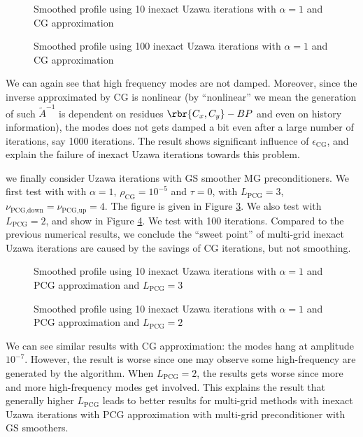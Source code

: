 \documentclass[english, nochinese]{pnote}
\begin{document}
\begin{figure}[htbp]
\centering
\scalebox{0.75}{}
\caption{Smoothed profile using 10 inexact Uzawa iterations with $ \alpha = 1 $ and CG approximation}
\label{Fig:SmoothIUzwCG10}
\end{figure}

\begin{figure}[htbp]
\centering
\scalebox{0.75}{}
\caption{Smoothed profile using 100 inexact Uzawa iterations with $ \alpha = 1 $ and CG approximation}
\label{Fig:SmoothIUzwCG1000}
\end{figure}

We can again see that high frequency modes are not damped. Moreover, since the inverse approximated by CG is nonlinear (by ``nonlinear'' we mean the generation of such $\tilde{A}^{-1}$ is dependent on residues $ \rbr{ C_x, C_y } - B P $ and even on history information), the modes does not gets damped a bit even after a large number of iterations, say 1000 iterations. The result shows significant influence of $\epsilon_{\text{CG}}$, and explain the failure of inexact Uzawa iterations towards this problem.

we finally consider Uzawa iterations with GS smoother MG preconditioners. We first test with with $ \alpha = 1 $, $ \rho_{\text{CG}} = 10^{-5} $ and $ \tau = 0 $, with $ L_{\text{PCG}} = 3 $, $ \nu_{ \text{PCG}, \text{down} } = \nu_{ \text{PCG}, \text{up} } = 4 $. The figure is given in Figure \ref{Fig:SmoothIUzwPCGL6}. We also test with $ L_{\text{PCG}} = 2 $, and show in Figure \ref{Fig:SmoothIUzwPCGL5}. We test with 100 iterations. Compared to the previous numerical results, we conclude the ``sweet point'' of multi-grid inexact Uzawa iterations are caused by the savings of CG iterations, but not smoothing.

\begin{figure}[htbp]
\centering
\scalebox{0.75}{}
\caption{Smoothed profile using 10 inexact Uzawa iterations with $ \alpha = 1 $ and PCG approximation and $ L_{\text{PCG}} = 3 $}
\label{Fig:SmoothIUzwPCGL6}
\end{figure}

\begin{figure}[htbp]
\centering
\scalebox{0.75}{}
\caption{Smoothed profile using 10 inexact Uzawa iterations with $ \alpha = 1 $ and PCG approximation and $ L_{\text{PCG}} = 2 $}
\label{Fig:SmoothIUzwPCGL5}
\end{figure}

We can see similar results with CG approximation: the modes hang at amplitude $10^{-7}$. However, the result is worse since one may observe some high-frequency are generated by the algorithm. When $ L_{\text{PCG}} = 2 $, the results gets worse since more and more high-frequency modes get involved. This explains the result that generally higher $L_{\text{PCG}}$ leads to better results for multi-grid methods with inexact Uzawa iterations with PCG approximation with multi-grid preconditioner with GS smoothers.
\end{document}
